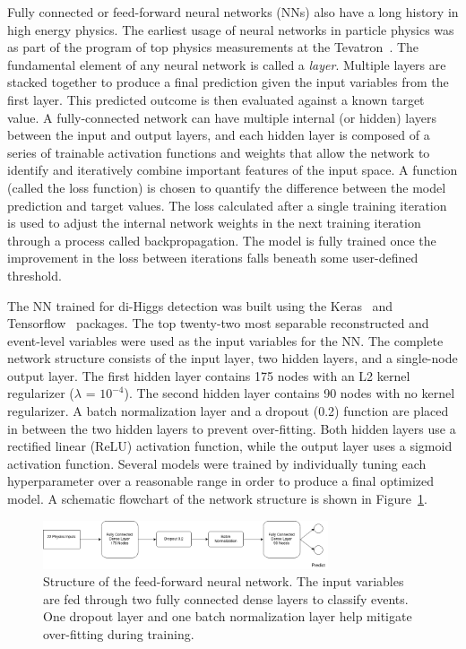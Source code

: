 \label{sec:NN}
Fully connected or feed-forward neural networks (NNs) also have a long history in high energy physics. The earliest usage of neural networks in particle physics was as part of the program of top physics measurements at the Tevatron~\cite{Abazov:2006gd, Aaltonen:2008sy}. The fundamental element of any neural network is called a \textit{layer}. Multiple layers are stacked together to produce a final prediction given the input variables from the first layer. This predicted outcome is then evaluated against a known target value. A fully-connected network can have multiple internal (or hidden) layers between the input and output layers, and each hidden layer is composed of a series of trainable activation functions and weights that allow the network to identify and iteratively combine important features of the input space. A function (called the loss function) is chosen to quantify the difference between the model prediction and target values. The loss calculated after a single training iteration is used to adjust the internal network weights in the next training iteration through a process called backpropagation. The model is fully trained once the improvement in the loss between iterations falls beneath some user-defined threshold.

The NN trained for di-Higgs detection was built using the Keras~\cite{chollet2015keras} and Tensorflow~\cite{tensorflow} packages. The top twenty-two most separable reconstructed and event-level variables were used as the input variables for the NN. The complete network structure consists of the input layer, two hidden layers, and a single-node output layer. The first hidden layer contains 175 nodes with an L2 kernel regularizer ($\lambda$ = $10^{-4}$). The second hidden layer contains 90 nodes with no kernel regularizer. A batch normalization layer and a dropout (0.2) function are placed in between the two hidden layers to prevent over-fitting. Both hidden layers use a rectified linear (ReLU) activation function, while the output layer uses a sigmoid activation function. Several models were trained by individually tuning each hyperparameter over a reasonable range in order to produce a final optimized model. A schematic flowchart of the network structure is shown in Figure~\ref{fig:nn}.

\begin{figure}[!h] 
\begin{center}
\includegraphics*[width=0.75\textwidth] {ffNN/figures/flowchart_ffNN.png}
\caption{Structure of the feed-forward neural network. The input variables are fed through two fully connected dense layers to classify events. One dropout layer and one batch normalization layer help mitigate over-fitting during training.}
  \label{fig:nn}
\end{center}
\end{figure}

